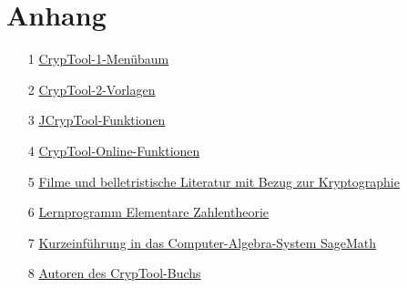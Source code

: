 
\renewcommand{\CTBChapName}{(Kap. PaP)}

\renewcommand{\CTBChapName}{(Kap. Primes)}

\renewcommand{\CTBChapName}{(Kap. NT)}

\renewcommand{\CTBChapName}{(Kap. ModernCrypto)}

\renewcommand{\CTBChapName}{(Kap. DigSig)}

\renewcommand{\CTBChapName}{(EllCurves)}

\renewcommand{\CTBChapName}{(BitCiphers)}

\renewcommand{\CTBChapName}{(Kap. HE)}

\renewcommand{\CTBChapName}{(DLogFact)}

\renewcommand{\CTBChapName}{(Crypto2020)}


\begin{appendix}
\newpage
\hypertarget{appendix-start}{}\label{s:appendix-start}
\chapter{Anhang}
    \begin{itemize}%
      \item[1] \hyperlink{appendix-menu-overview-CT1}{CrypTool-1-Menübaum}
      \item[2] \hyperlink{appendix-template-overview-CT2}{CrypTool-2-Vorlagen}
      \item[3] \hyperlink{appendix-function-overview-JCT}{JCrypTool-Funktionen}
      \item[4] \hyperlink{appendix-function-overview-CTO}{CrypTool-Online-Funktionen}
      \item[5] \hyperlink{appendix-movies}{Filme und belletristische
                          Literatur mit Bezug zur Kryptographie}
      \item[6] \hyperlink{appendix-Learn-NT}
                         {Lernprogramm Elementare Zahlentheorie}
      \item[7] \hyperlink{appendix-using-sage}
                         {Kurzeinführung in das Computer-Algebra-System SageMath}
      \item[8] \hyperlink{appendix-authors}{Autoren des CrypTool-Buchs}
    \end{itemize}
\renewcommand{\CTBChapName}{(Appendix\_Menus)}

\renewcommand{\CTBChapName}{(Appendix\_LearnTool)}

\renewcommand{\CTBChapName}{(Appendix\_Sage)}

\renewcommand{\CTBChapName}{(Appendix\_Authors)}

\end{appendix}


